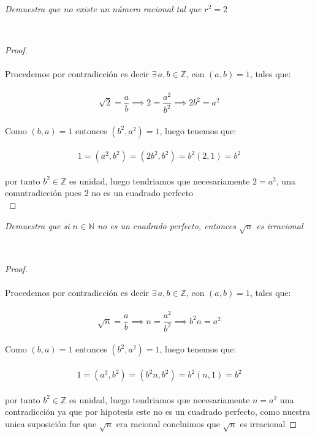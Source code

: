 \documentclass[11pt,letterpaper]{article}
\newcommand{\N}{\mathbb{N}}
\newcommand{\Z}{\mathbb{Z}}
\begin{document}
\begin{tcolorbox}[
	title = \textcolor{black}{\textcolor{white}{Problema 10}},]
\textit{
Demuestra que no existe un n\'umero racional tal que $r^2=2$
}
\end{tcolorbox}\,\\
\begin{proof}\,\\
    \,\\
Procedemos por contradicci\'on es decir $\exists\,a,b\in \Z$, con $(a,b)=1$, tales que:\,\\
    \,\\
    \begin{equation*}
        \sqrt{2}=\frac{a}{b} \implies 2=\frac{a^2}{b^2}\implies 2b^2=a^2
    \end{equation*}\,\\
    Como $(b,a)=1$ entonces $(b^2,a^2)=1$, luego tenemos que:\,\\
    \,\\
    \begin{equation*}
        1=(a^2,b^2)=(2b^2,b^2)=b^2(2,1)=b^2
    \end{equation*}\,\\
    por tanto $b^2\in\Z$ es unidad, luego tendriamos que necesariamente $2=a^2$, una comntradicci\'on pues $2$ no es un cuadrado perfecto
    \,\\
\end{proof}
\newpage
\begin{tcolorbox}[
	title = \textcolor{black}{\textcolor{white}{Problema 11}},]
\textit{
Demuestra que si $n\in \N$ no es un cuadrado perfecto, entonces $\sqrt{n}$ es irracional
}
\end{tcolorbox}\,\\
\begin{proof}\,\\
    \,\\
    Procedemos por contradicci\'on es decir $\exists\,a,b\in \Z$, con $(a,b)=1$, tales que:\,\\
    \,\\
    \begin{equation*}
        \sqrt{n}=\frac{a}{b} \implies n=\frac{a^2}{b^2}\implies b^2n=a^2
    \end{equation*}\,\\
    Como $(b,a)=1$ entonces $(b^2,a^2)=1$, luego tenemos que:\,\\
    \,\\
    \begin{equation*}
        1=(a^2,b^2)=(b^2n,b^2)=b^2(n,1)=b^2
    \end{equation*}\,\\
    por tanto $b^2\in\Z$ es unidad, luego tendriamos que necesariamente $n=a^2$ una contradicci\'on
    ya que por hipotesis este no es un cuadrado perfecto, como nuestra unica suposici\'on fue que $\sqrt{n}$
    era racional concluimos que $\sqrt{n}$ es irracional
\end{proof}\,\\
\end{document}
